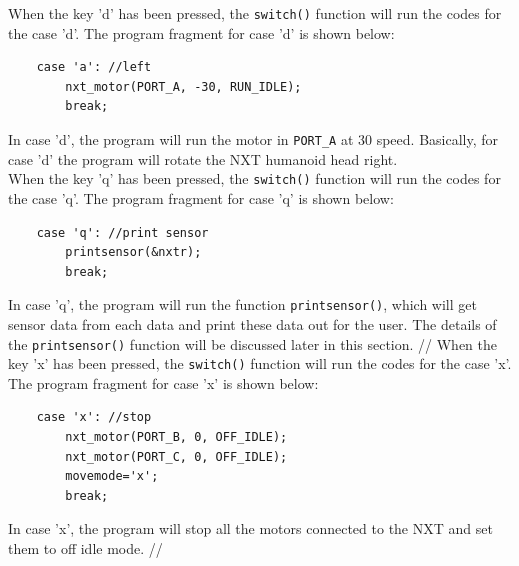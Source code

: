 \documentclass[12pt]{article}
\begin{document}
When the key 'd' has been pressed, the \verb+switch()+ function will run the codes for the case 'd'.
The program fragment for case 'd' is shown below:
\begin{verbatim} 
    case 'a': //left
        nxt_motor(PORT_A, -30, RUN_IDLE);
        break;
\end{verbatim}
In case 'd', the program will run the motor in \verb+PORT_A+ at 30 speed.
Basically, for case 'd' the program will rotate the NXT humanoid head right.
\\
When the key 'q' has been pressed, the \verb+switch()+ function will run the codes for the case 'q'.
The program fragment for case 'q' is shown below:
\begin{verbatim} 
    case 'q': //print sensor
        printsensor(&nxtr);
        break;
\end{verbatim}
In case 'q', the program will run the function \verb+printsensor()+, which will get sensor data from each data and
    print these data out for the user.
The details of the \verb+printsensor()+ function will be discussed later in this section.
//
When the key 'x' has been pressed, the \verb+switch()+ function will run the codes for the case 'x'.
The program fragment for case 'x' is shown below:
\begin{verbatim} 
    case 'x': //stop
        nxt_motor(PORT_B, 0, OFF_IDLE);
        nxt_motor(PORT_C, 0, OFF_IDLE);
        movemode='x';
        break;
\end{verbatim}
In case 'x', the program will stop all the motors connected to the NXT and set them to off idle mode.
//
\end{document}
